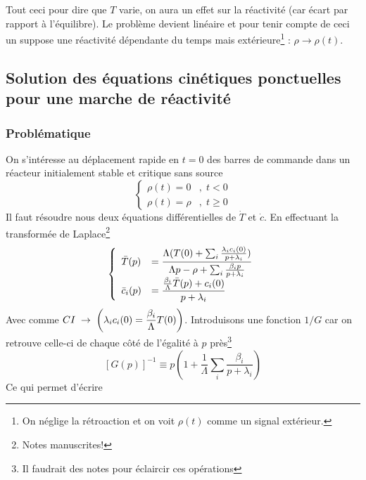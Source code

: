 Tout ceci pour dire que $T$ varie, on aura un effet sur la réactivité (car écart par rapport à 
l'équilibre). Le problème devient linéaire et pour tenir compte de ceci un suppose une réactivité
dépendante du temps mais extérieure\footnote{On néglige la rétroaction et on voit $\rho(t)$ comme 
un signal extérieur.} : $\rho\to\rho(t)$.

\subsection{Solution des équations cinétiques ponctuelles pour une marche de réactivité}
\subsubsection{Problématique}
On s'intéresse au déplacement rapide en $t=0$ des barres de commande dans un réacteur initialement
stable et critique sans source
\begin{equation}
\left\{ {\begin{array}{*{20}{c}}
{\rho (t) = 0}&{,\;t < 0}\\
{\rho (t) = \rho }&{,\;t \ge 0}
\end{array}} \right.
\end{equation}
Il faut résoudre nous deux équations différentielles de $\dot{T}$ et $\dot{c}$. En effectuant 
la transformée de Laplace\footnote{Notes manuscrites!}
\begin{equation}
\left\{\begin{array}{ll}
\bar T(p) &\DS= \frac{{\Lambda (T(0) + \sum\nolimits_i    {\textstyle{{{\lambda _i}{c_i}(0)} \over {p + {\lambda _i}}}})}}{{\Lambda p - \rho  + \sum\nolimits_i    {\textstyle{{{\beta _i}p} \over {p + {\lambda _i}}}}}}\\
{\bar c_i}(p) &\DS= \frac{{{\textstyle{{{\beta _i}} \over \Lambda }}\bar T(p) + {c_i}(0)}}{{p + {\lambda _i}}}
\end{array}\right.
\end{equation}
Avec comme $\DS CI\; \to \;\left( {{\lambda _i}{c_i}(0) = \frac{{{\beta _i}}}{\Lambda }T(0)} \right)$. 
Introduisons une fonction $1/G$ car on retrouve celle-ci de chaque côté de l'égalité à $p$ près\footnote{Il faudrait des notes pour éclaircir ces opérations}
\begin{equation}
{[G(p)]^{ - 1}} \equiv p\left(   \right.1 + \frac{1}{\Lambda }\sum\limits_i    \frac{{{\beta _i}}}{{p + {\lambda _i}}}\left.    \right)
\end{equation}
Ce qui permet d'écrire\\
